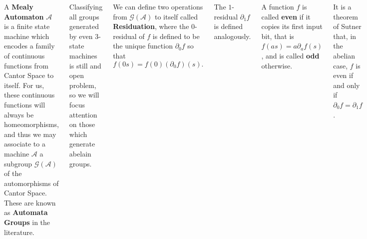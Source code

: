 \documentclass[24pt]{tikzposter}
\theoremstyle{definition}
\newcommand{\Z}{\mathbb{Z}}
\newcommand{\del}{\partial}
\begin{document}
\begin{columns}
  {
    A \textbf{Mealy Automaton} $\mathcal{A}$ is a finite state 
    machine which encodes a family of continuous functions from 
    Cantor Space to itself. For us, these continuous functions 
    will always be homeomorphisms, and thus we may associate
    to a machine $\mathcal{A}$ a subgroup $\mathcal{G}(\mathcal{A})$
    of the automorphisms of Cantor Space. These are known as 
    \textbf{Automata Groups} in the literature.

    \bigskip

    Classifying all groups generated by even 3-state machines is still
    and open problem, so we will focus attention on those which generate
    abelain groups.

    \bigskip

    We can define two operations from $\mathcal{G}(\mathcal{A})$ to 
    itself called \textbf{Residuation}, where the $0$-residual
    of $f$ is defined to be the unique function $\del_0 f$ so that 
    \[ f(0s) = f(0) (\del_0 f)(s) .\]

    The $1$-residual $\del_1 f$ is defined analogously.

    \bigskip

    A function $f$ is called \textbf{even} if it copies its first input bit,
    that is $f(as) = a \del_a f(s)$, and is called \textbf{odd} otherwise.

    \bigskip

    It is a theorem of Sutner that, in the abelian case, $f$ is even 
    if and only if $\del_0 f = \del_1 f$.
  }

  {
    In their paper ``Automorphisms of the binary tree: 
    State-closed subgroups and dynamics of 1/2-endomorphisms'', 
    Nerkashevych and Sidki show that abelian automata groups are
    isomorphic to integer lattices, and moreover, there is a 
    ``1/2-integral'' matrix $\mathbf{A}_\mathcal{A}$ of irreducible character 
    so that residuation lifts to an affine map. Succinctly, for some $\varphi$:


    \[ \varphi : \mathcal{G}(\mathcal{A}) \cong \Z^m \]

    \[ 
      \varphi(\del_0 f) = 
      \begin{cases} 
        \mathbf{A} \varphi(f) & \text{$f$ even} \\
        \mathbf{A} (\varphi(f) - \overline{e}) & \text{$f$ odd}
      \end{cases}
    \]

}
\end{columns}
\end{document}

